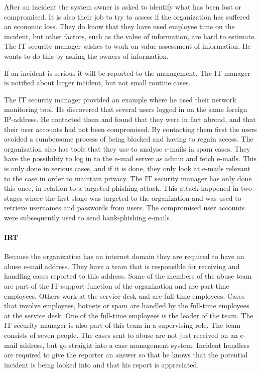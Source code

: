 After an incident the system owner is asked to identify what has been lost or compromised. It is also their job to try to assess if the organization has suffered an economic loss. They do know that they have used employee time on the incident, but other factors, such as the value of information, are hard to estimate. The IT security manager wishes to work on value assessment of information. He wants to do this by asking the owners of information.

If an incident is serious it will be reported to the management. The IT manager is notified about larger incident, but not small routine cases.

The IT security manager provided an example where he used their network monitoring tool. He discovered that several users logged in on the same foreign IP-address. He contacted them and found that they were in fact abroad, and that their user accounts had not been compromised. By contacting them first the users avoided a cumbersome process of being blocked and having to regain access. The organization also has tools that they use to analyse e-mails in spam cases. They have the possibility to log in to the e-mail server as admin and fetch e-mails. This is only done in serious cases, and if it is done, they only look at e-mails relevant to the case in order to maintain privacy. The IT security manager has only done this once, in relation to a targeted phishing attack. This attack happened in two stages where the first stage was targeted to the organization and was used to retrieve usernames and passwords from users. The compromised user accounts were subsequently used to send bank-phishing e-mails.

\paragraph{\acl{IRT}}
Because the organization has an internet domain they are required to have an abuse e-mail address. They have a team that is responsible for receiving and handling cases reported to this address. Some of the members of the abuse team are part of the IT-support function of the organization and are part-time employees. Others work at the service desk and are full-time employees. Cases that involve employees, botnets or spam are handled by the full-time employees at the service desk. One of the full-time employees is the leader of the team. The IT security manager is also part of this team in a supervising role. The team consists of seven people. The cases sent to abuse are not just received on an e-mail address, but go straight into a case management system. Incident handlers are required to give the reporter an answer so that he knows that the potential incident is being looked into and that his report is appreciated.

